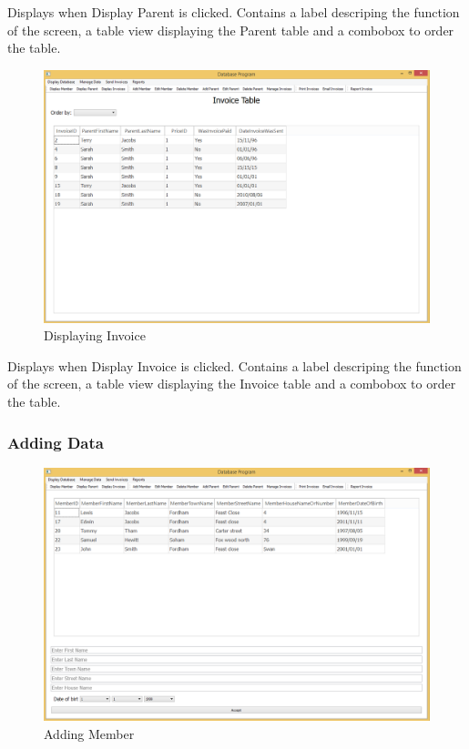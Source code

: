 Displays when Display Parent is clicked. Contains a label descriping the function of the screen, a table view displaying the Parent table and a combobox to order the table.

\begin{figure}[H]
\includegraphics[width=\textwidth]{./Maintenance/Images/DisplayInvoice.png}
    \caption{Displaying Invoice} \label{fig:display_invoice}
\end{figure}

Displays when Display Invoice is clicked. Contains a label descriping the function of the screen, a table view displaying the Invoice table and a combobox to order the table.

\subsubsection{Adding Data}
\begin{figure}[H]
\includegraphics[width=\textwidth]{./Maintenance/Images/AddMember.png}
    \caption{Adding Member} \label{fig:add_member}
\end{figure}

